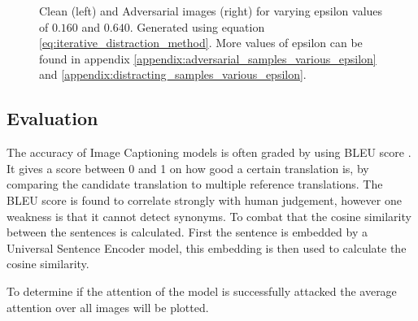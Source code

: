 \begin{figure}[h]
    \centering
    \vspace{\floatsep}
    \vspace{\floatsep}
    \vspace{\floatsep}
    \caption{Clean (left) and Adversarial images (right) for varying epsilon values of $0.160$ and $0.640$. Generated using equation \ref{eq:iterative_distraction_method}. More values of epsilon can be found in appendix \ref{appendix:adversarial_samples_various_epsilon} and \ref{appendix:distracting_samples_various_epsilon}.}
    \label{fig:distract_noise_examples}
\end{figure}

\subsection{Evaluation}
The accuracy of Image Captioning models is often graded by using BLEU score \cite{papineni_roukos_ward_zhu_2001}. It gives a score between 0 and 1 on how good a certain translation is, by comparing the candidate translation to multiple reference translations. The BLEU score is found to correlate strongly with human judgement, however one weakness is that it cannot detect synonyms. To combat that the cosine similarity between the sentences is calculated. First the sentence is embedded by a Universal Sentence Encoder\cite{DBLP:journals/corr/abs-1803-11175} model, this embedding is then used to calculate the cosine similarity.

To determine if the attention of the model is successfully attacked the average attention over all images will be plotted.